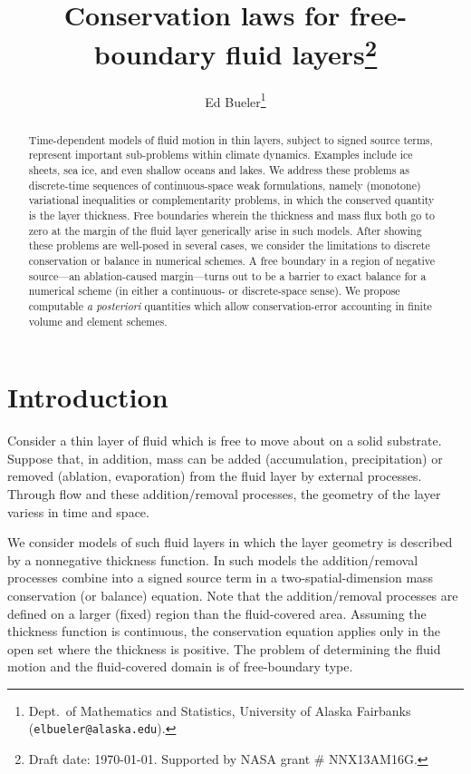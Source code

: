 \documentclass[final,onefignum]{siamart190516}
\title{Conservation laws for free-boundary fluid layers\thanks{Draft date: \today.  Supported by NASA grant \# NNX13AM16G.}}
\author{Ed Bueler\thanks{Dept.~of Mathematics and Statistics, University of Alaska Fairbanks \,\, (\texttt{elbueler@alaska.edu}).}}
\begin{document}
\maketitle

\begin{abstract}
Time-dependent models of fluid motion in thin layers, subject to signed source terms, represent important sub-problems within climate dynamics.  Examples include ice sheets, sea ice, and even shallow oceans and lakes.  We address these problems as discrete-time sequences of continuous-space weak formulations, namely (monotone) variational inequalities or complementarity problems, in which the conserved quantity is the layer thickness.  Free boundaries wherein the thickness and mass flux both go to zero at the margin of the fluid layer generically arise in such models.  After showing these problems are well-posed in several cases, we consider the limitations to discrete conservation or balance in numerical schemes.  A free boundary in a region of negative source---an ablation-caused margin---turns out to be a barrier to exact balance for a numerical scheme (in either a continuous- or discrete-space sense).  We propose computable \emph{a posteriori} quantities which allow conservation-error accounting in finite volume and element schemes.
\end{abstract}


\pagestyle{myheadings}
\thispagestyle{plain}


\section{Introduction}  \label{sec:intro}

Consider a thin layer of fluid which is free to move about on a solid substrate.  Suppose that, in addition, mass can be added (accumulation, precipitation) or removed (ablation, evaporation) from the fluid layer by external processes.  Through flow and these addition/removal processes, the geometry of the layer variess in time and space.

We consider models of such fluid layers in which the layer geometry is described by a nonnegative thickness function.  In such models the addition/removal processes combine into a signed source term in a two-spatial-dimension mass conservation (or balance) equation.  Note that the addition/removal processes are defined on a larger (fixed) region than the fluid-covered area.  Assuming the thickness function is continuous, the conservation equation applies only in the open set where the thickness is positive.  The problem of determining the fluid motion and the fluid-covered domain is of free-boundary type.
\end{document}
